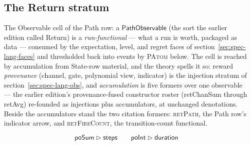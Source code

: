 

\subsection{The Return stratum}
\label{sec:spec-lang-returnstratum}

The Observable cell of the Path row: a
$\mathsf{PathObservable}$ (the sort the earlier edition called
\textsf{Return}) is a \emph{run-functional} --- what a run is worth,
packaged as data --- consumed by the expectation, level, and regret
faces of section~\ref{sec:spec-lang-faces} and thresholded back into
events by \textsc{PAtom} below. The cell is reached by accumulation
from State-row material, and the
theory spells it so: reward \emph{provenance} (channel,
gate, polynomial view, indicator) is the injection stratum of
section~\ref{sec:spec-lang-obs}, and \emph{accumulation} is five
formers over one observable --- the earlier edition's
provenance-fused constructor roster (\textsf{retChanSum} through
\textsf{retAvg}) re-founded as injections plus accumulators, at
unchanged denotations. Beside the accumulators stand the two
citation formers: \textsc{retPath}, the Path row's indicator arrow,
and \textsc{retFireCount}, the transition-count functional.

\[
\mathsf{poSum} \rhd \mathsf{steps}
\qquad
\mathsf{poInt} \rhd \mathsf{duration}
\]

